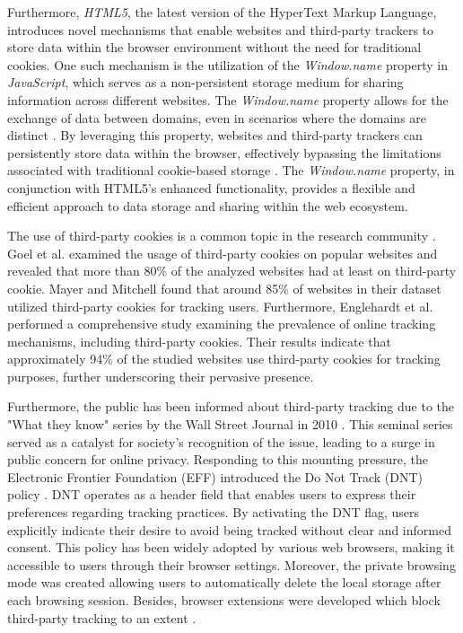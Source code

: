 Furthermore, \emph{HTML5}, the latest version of the HyperText Markup Language, introduces novel mechanisms that enable websites and
third-party trackers to store data within the browser environment without the need for traditional cookies. One such mechanism
is the utilization of the \emph{Window.name} property in \emph{JavaScript}, which serves as a non-persistent storage medium for sharing
information across different websites. The \emph{Window.name} property allows for the exchange of data between domains,
even in scenarios where the domains are distinct \cite{sy2018tracking}. By leveraging this property, websites and third-party trackers
can persistently store data within the browser, effectively bypassing the limitations associated with traditional
cookie-based storage \cite{pan2015not}. The \emph{Window.name} property, in conjunction with HTML5's enhanced functionality, provides a
flexible and efficient approach to data storage and sharing within the web ecosystem.

The use of third-party cookies is a common topic in the research community \cite{mayer2012third,
roesner2012detecting, nikiforakis2013cookieless, west2012analysis,krishnamurthy2006generating,englehardt2015cookies}.
Goel et al. \cite{goel2010anatomy} examined the usage of third-party cookies on popular websites and revealed that more than
80\% of the analyzed websites had at least on third-party cookie. Mayer and Mitchell \cite{mayer2012third} found that around
85\% of websites in their dataset utilized third-party cookies for tracking users. Furthermore, Englehardt et al.
\cite{englehardt2016online} performed a comprehensive study examining the prevalence of online tracking mechanisms, including third-party cookies. Their results indicate 
that approximately 94\% of the studied websites use third-party cookies for tracking purposes,
further underscoring their pervasive presence.

Furthermore, the public has been informed about third-party tracking due to the "What they know" series by the Wall Street Journal
in 2010 \cite{whattheyknow}. This seminal series served as a catalyst for society's recognition of the issue, leading to a surge in public concern for online privacy. Responding to this mounting pressure, the Electronic Frontier Foundation (EFF)
introduced the Do Not Track (DNT) policy \cite{dnt}. DNT operates as a header field that enables users to express
their preferences regarding tracking practices. By activating the DNT flag, users explicitly indicate their
desire to avoid being tracked without clear and informed consent. This policy has been widely adopted by various web browsers,
making it accessible to users through their browser settings. Moreover, the private browsing mode was created allowing users to automatically delete the local 
storage after each browsing session. Besides, browser extensions were developed which block third-party tracking to an extent \cite{ghostery,abp,shareMeNot}.

